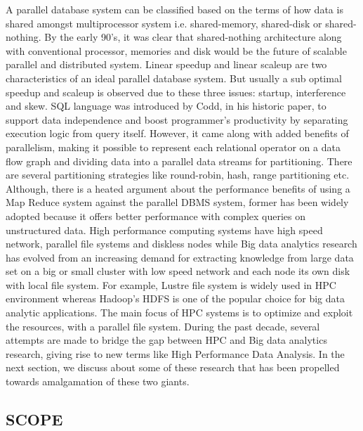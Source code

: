 \documentclass[runningheads,a4paper]{llncs}
\begin{document}
{A parallel database system can be classified based on the terms of how data is shared amongst multiprocessor system i.e. shared-memory, shared-disk or shared-nothing. By the early 90's, it was clear that shared-nothing architecture along with conventional processor, memories and disk would be the future of scalable parallel and distributed system. Linear speedup and linear scaleup are two characteristics of an ideal parallel database system. But usually a sub optimal speedup and scaleup is observed due to these three issues: startup, interference and skew. SQL language was introduced by Codd, in his historic paper, to support data independence and boost programmer's productivity by separating execution logic from query itself. However, it came along with added benefits of parallelism, making it possible to represent each relational operator on a data flow graph and dividing data into a parallel data streams for partitioning. There are several partitioning strategies like round-robin, hash, range partitioning etc. \\

Although, there is a heated argument about the performance benefits of using a Map Reduce system against the parallel DBMS system, former has been widely adopted because it offers better performance with complex queries on unstructured data. High performance computing systems have high speed network, parallel file systems and diskless nodes while Big data analytics research has evolved from an increasing demand for extracting knowledge from large data set on a big or small cluster with low speed network and each node its own disk with local file system. For example, Lustre file system is widely used in HPC environment whereas Hadoop's HDFS is one of the popular choice for big data analytic applications. The main focus of HPC systems is to optimize and exploit the resources, with a parallel file system. During the past decade, several attempts are made to bridge the gap between HPC and Big data analytics research, giving rise to new terms like High Performance Data Analysis. In the next section, we discuss about some of these research that has been propelled towards amalgamation of these two giants.\\

\subsection*{SCOPE}

}
\end{document}
